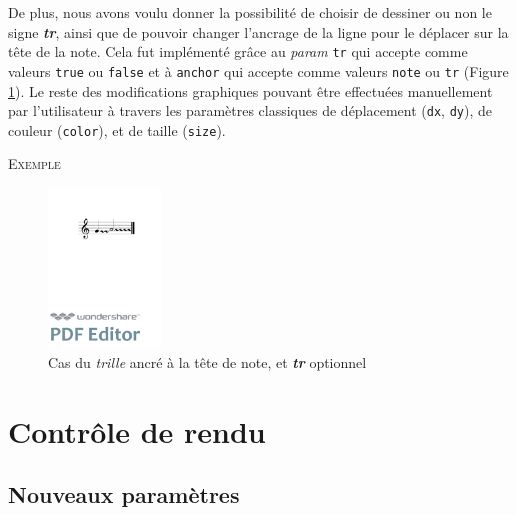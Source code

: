 \documentclass{article}
\newenvironment{gmncode}	{\vspace{-2mm}\small\verbatim}{\endverbatim\vspace{-2mm}}
\newcommand{\code}[1]		{{\small \texttt{#1}}}
\newcommand{\exemple}		{\vspace{2mm}\hspace*{-6mm}\textsc{Exemple}}
\begin{document}

De plus, nous avons voulu donner la possibilité de choisir de dessiner ou non le signe \textit{\textbf{tr}}, ainsi que de pouvoir changer l'ancrage de la ligne pour le déplacer sur la tête de la note. Cela fut implémenté grâce au \emph{param} \code{tr} qui accepte comme valeurs \code{true} ou \code{false} et à \code{anchor} qui accepte comme valeurs \code{note} ou \code{tr} (Figure \ref{fig:trillanchor}). Le reste des modifications graphiques pouvant être effectuées manuellement par l'utilisateur à travers les paramètres classiques de déplacement (\code{dx}, \code{dy}), de couleur (\code{color}), et de taille (\code{size}).

\exemple
\begin{figure}[h]
\centering
\begin{gmncode}
[ \trill<tr="false", anchor="note">
( {g} {a/2} ) ]
\end{gmncode}
\includegraphics[width=30mm]{img/trillanchor.pdf}
\caption{Cas du \emph{trille} ancré à la tête de note, et \textit{\textbf{tr}} optionnel}
\label{fig:trillanchor}
\end{figure}


\section{Contr\^ole de rendu}\label{sec:controleRendu}

\subsection{Nouveaux paramètres}\label{subsubsec:attributs}
\end{document}
